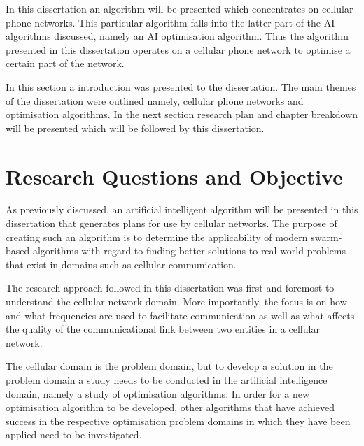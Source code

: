In this dissertation an algorithm will be presented which concentrates on cellular phone networks. This particular algorithm falls into the latter part of the AI algorithms discussed, namely an AI optimisation algorithm. Thus the algorithm presented in this dissertation operates on a cellular phone network to optimise a certain part of the network.

In this section a introduction was presented to the dissertation. The main themes of the dissertation were outlined namely, cellular phone networks and optimisation algorithms. In the next section research plan and chapter breakdown will be presented which will be followed by this dissertation.
\section{Research Questions and Objective}
As previously discussed, an artificial intelligent algorithm will be presented in this dissertation that generates plans for use by cellular networks. The purpose of creating such an algorithm is to determine the applicability of modern swarm-based algorithms with regard to finding better solutions to real-world problems that exist in domains such as cellular communication.

The research approach followed in this dissertation was first and foremost to understand the cellular network domain. More importantly, the focus is on how and what frequencies are used to facilitate communication as well as what affects the quality of the communicational link between two entities in a cellular network. 

The cellular domain is the problem domain, but to develop a solution in the problem domain a study needs to be conducted in the artificial intelligence domain, namely a study of optimisation algorithms. In order for a new optimisation algorithm to be developed, other algorithms that have achieved success in the respective optimisation problem domains in which they have been applied need to be investigated.


